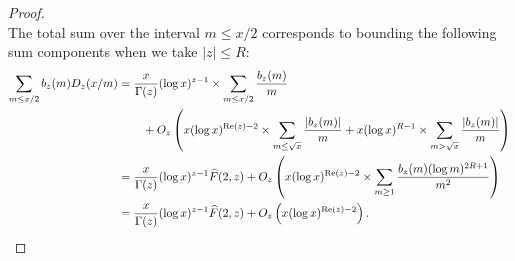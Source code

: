 \documentclass[11pt,reqno,a4letter]{article}
\numberwithin{figure}{section}
\numberwithin{table}{section}
\theoremstyle{plain}
\numberwithin{theorem}{section}
\theoremstyle{definition}
\renewcommand{\Re}{\operatorname{Re}}
\begin{document}
\begin{proof}
\[\]
The total sum over the interval $m \leq x/2$ corresponds to bounding the following 
sum components when we take $|z| \leq R$: 
\begin{align*} 
\sum_{m \leq x/2} b_z(m) D_z(x/m) & = \frac{x}{\Gamma(z)} (\log x)^{z-1} \times 
     \sum_{m \leq x/2} \frac{b_z(m)}{m} \\ 
     & \phantom{=\quad\ } + 
     O_z\left(x (\log x)^{\Re(z)-2} \times \sum_{m \leq \sqrt{x}} \frac{|b_z(m)|}{m} + 
     x (\log x)^{R-1} \times \sum_{m > \sqrt{x}} \frac{|b_z(m)|}{m}\right) \\ 
     & = \frac{x}{\Gamma(z)} (\log x)^{z-1} \widehat{F}(2, z) + O_z\left( 
     x (\log x)^{\Re(z)-2} \times \sum_{m \geq 1} \frac{b_z(m) (\log m)^{2R+1}}{m^2} 
     \right) \\ 
     & = \frac{x}{\Gamma(z)} (\log x)^{z-1} \widehat{F}(2, z) + O_z\left( 
     x (\log x)^{\Re(z)-2}\right). 
     \qedhere  
\end{align*} 
\end{proof} 
\end{document}
